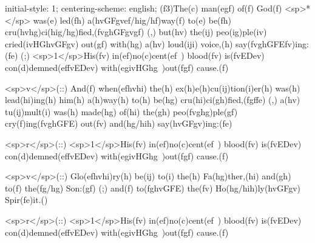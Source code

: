 initial-style: 1;
centering-scheme: english;
(f3)The(c) man(egf) of(f) God(f) <sp>*</sp> was(e) led(fh) a(hvGFgvef/hig/hf)way(f) to(e) be(fh) cru(hvhg)ci(hig/hg)fied,(fvghGFgvgf) (,) but(hv) the(ij) peo(ig)ple(iv) cried(ivHGhvGFgv) out(gf) with(hg) a(hv) loud(iji) voice,(h) say(fvghGFEfv)ing:(fe) (;) <sp>1</sp>His(fv) in(ef)no(c)cent(ef~) blood(fv) is(fvEDev) con(d)demned(effvEDev) with(egivHGhg~)out(fgf) cause.(f)

<sp>v</sp>(::) And(f) when(efhvhi) the(h) ex(h)e(h)cu(ij)tion(i)er(h) was(h) lead(hi)ing(h) him(h) a(h)way(h) to(h) be(hg) cru(hi)ci(gh)fied,(fgffe) (,) a(hv) tu(ij)mult(i) was(h) made(hg) of(hi) the(gh) peo(fvghg)ple(gf) cry(f)ing(fvghGFE) out(fv) and(hg/hih) say(hvGFgv)ing:(fe)

<sp>r</sp>(::) <sp>1</sp>His(fv) in(ef)no(c)cent(ef~) blood(fv) is(fvEDev) con(d)demned(effvEDev) with(egivHGhg~)out(fgf) cause.(f)

<sp>v</sp>(::) Glo(efhvhi)ry(h) be(ij) to(i) the(h) Fa(hg)ther,(hi) and(gh) to(f) the(fg/hg) Son:(gf) (;) and(f) to(fghvGFE) the(fv) Ho(hg/hih)ly(hvGFgv) Spir(fe)it.()

<sp>r</sp>(::) <sp>1</sp>His(fv) in(ef)no(c)cent(ef~) blood(fv) is(fvEDev) con(d)demned(effvEDev) with(egivHGhg~)out(fgf) cause.(f)
